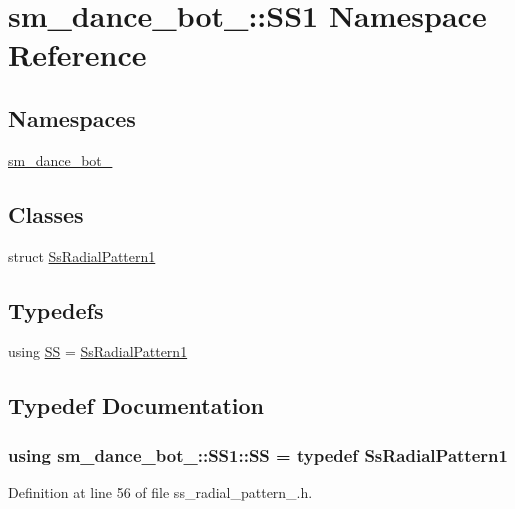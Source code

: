 \hypertarget{namespacesm__dance__bot__2_1_1SS1}{}\section{sm\+\_\+dance\+\_\+bot\+\_\+:\+:S\+S1 Namespace Reference}
\label{namespacesm__dance__bot__2_1_1SS1}
\subsection*{Namespaces}
\begin{DoxyCompactItemize}
\item 
 \hyperlink{namespacesm__dance__bot__2_1_1SS1_1_1sm__dance__bot__2}{sm\+\_\+dance\+\_\+bot\+\_}
\end{DoxyCompactItemize}
\subsection*{Classes}
\begin{DoxyCompactItemize}
\item 
struct \hyperlink{structsm__dance__bot__2_1_1SS1_1_1SsRadialPattern1}{Ss\+Radial\+Pattern1}
\end{DoxyCompactItemize}
\subsection*{Typedefs}
\begin{DoxyCompactItemize}
\item 
using \hyperlink{namespacesm__dance__bot__2_1_1SS1_a01643449f4dda719d7f3a47d09453ed0}{SS} = \hyperlink{structsm__dance__bot__2_1_1SS1_1_1SsRadialPattern1}{Ss\+Radial\+Pattern1}
\end{DoxyCompactItemize}


\subsection{Typedef Documentation}
\subsubsection[{\texorpdfstring{SS}{SS}}]{\setlength{\rightskip}{0pt plus 5cm}using {\bf sm\+\_\+dance\+\_\+bot\+\_\+::\+S\+S1\+::\+SS} = typedef {\bf Ss\+Radial\+Pattern1}}\hypertarget{namespacesm__dance__bot__2_1_1SS1_a01643449f4dda719d7f3a47d09453ed0}{}\label{namespacesm__dance__bot__2_1_1SS1_a01643449f4dda719d7f3a47d09453ed0}


Definition at line 56 of file ss\+\_\+radial\+\_\+pattern\+\_.\+h.

